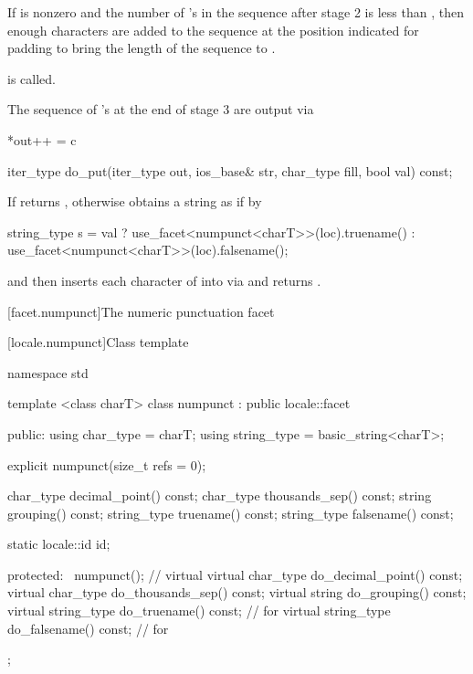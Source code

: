 \begin{itemdescr}
\begin{description}
If
is nonzero and the number of
's
in the sequence after stage 2 is less than
,
then enough  characters are added to the sequence at the position
indicated for padding to bring the length of the sequence to
.
 
is called.

The sequence of
's
at the end of stage 3 are output via

\begin{codeblock}
*out++ = c
\end{codeblock}
\end{description}
\end{itemdescr}

%
%
\begin{itemdecl}
iter_type do_put(iter_type out, ios_base& str, char_type fill,
                 bool val) const;
\end{itemdecl}

\begin{itemdescr}
\pnum
\returns
If
returns
,
otherwise obtains a string
as if by
\begin{codeblock}
string_type s =
  val ? use_facet<numpunct<charT>>(loc).truename()
    : use_facet<numpunct<charT>>(loc).falsename();
\end{codeblock}
and then inserts each character
of
into
via
and returns
.
\end{itemdescr}

[facet.numpunct]{The numeric punctuation facet}

[locale.numpunct]{Class template }

%
\begin{codeblock}
namespace std {
  template <class charT>
  class numpunct : public locale::facet {
  public:
    using char_type   = charT;
    using string_type = basic_string<charT>;

    explicit numpunct(size_t refs = 0);

    char_type    decimal_point()   const;
    char_type    thousands_sep()   const;
    string       grouping()        const;
    string_type  truename()        const;
    string_type  falsename()       const;

    static locale::id id;

  protected:
   ~numpunct();                 // virtual
    virtual char_type    do_decimal_point() const;
    virtual char_type    do_thousands_sep() const;
    virtual string       do_grouping()      const;
    virtual string_type  do_truename()      const;      // for 
    virtual string_type  do_falsename()     const;      // for 
  };
}
\end{codeblock}

